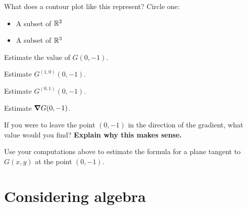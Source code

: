\documentclass[handout,noauthor,nooutcomes]{ximera}
\begin{document}
\begin{problem}
  What does a contour plot like this represent? Circle one:
    \begin{itemize}
    \item A subset of $\mathbb R^2$
    \item A subset of $\mathbb R^3$
    \end{itemize}
\end{problem}

\begin{problem}
  Estimate the value of $G(0,-1)$.
\end{problem}

\begin{problem}
  Estimate $G^{(1,0)}(0,-1)$.
\end{problem}

\begin{problem}
  Estimate $G^{(0,1)}(0,-1)$.
\end{problem}

\begin{problem}
  Estimate $\boldsymbol\nabla G(0,-1)$.
\end{problem}

\begin{problem}
  If you were to leave the point $(0,-1)$ in the direction of the
  gradient, what value would you find? \textbf{Explain why this makes
    sense.}
\end{problem}

\begin{problem}
  Use your computations above to estimate the formula for a plane
  tangent to $G(x,y)$ at the point $(0,-1)$.
\end{problem}

\section{Considering algebra}
\end{document}
